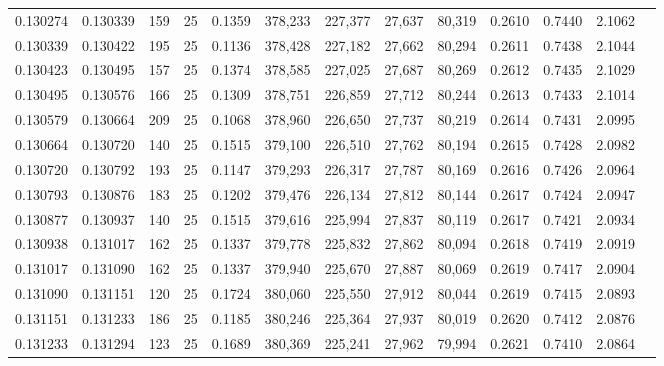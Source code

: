 \begin{tabular}{rrrrrrrrrrrrr}
0.130274 & 0.130339 &   159 &  25 &                                     0.1359 & 378,233 & 227,377 &  27,637 &  80,319 & 0.2610 & 0.7440 & 2.1062 \\
0.130339 & 0.130422 &   195 &  25 &                                     0.1136 & 378,428 & 227,182 &  27,662 &  80,294 & 0.2611 & 0.7438 & 2.1044 \\
0.130423 & 0.130495 &   157 &  25 &                                     0.1374 & 378,585 & 227,025 &  27,687 &  80,269 & 0.2612 & 0.7435 & 2.1029 \\
0.130495 & 0.130576 &   166 &  25 &                                     0.1309 & 378,751 & 226,859 &  27,712 &  80,244 & 0.2613 & 0.7433 & 2.1014 \\
0.130579 & 0.130664 &   209 &  25 &                                     0.1068 & 378,960 & 226,650 &  27,737 &  80,219 & 0.2614 & 0.7431 & 2.0995 \\
0.130664 & 0.130720 &   140 &  25 &                                     0.1515 & 379,100 & 226,510 &  27,762 &  80,194 & 0.2615 & 0.7428 & 2.0982 \\
0.130720 & 0.130792 &   193 &  25 &                                     0.1147 & 379,293 & 226,317 &  27,787 &  80,169 & 0.2616 & 0.7426 & 2.0964 \\
0.130793 & 0.130876 &   183 &  25 &                                     0.1202 & 379,476 & 226,134 &  27,812 &  80,144 & 0.2617 & 0.7424 & 2.0947 \\
0.130877 & 0.130937 &   140 &  25 &                                     0.1515 & 379,616 & 225,994 &  27,837 &  80,119 & 0.2617 & 0.7421 & 2.0934 \\
0.130938 & 0.131017 &   162 &  25 &                                     0.1337 & 379,778 & 225,832 &  27,862 &  80,094 & 0.2618 & 0.7419 & 2.0919 \\
0.131017 & 0.131090 &   162 &  25 &                                     0.1337 & 379,940 & 225,670 &  27,887 &  80,069 & 0.2619 & 0.7417 & 2.0904 \\
0.131090 & 0.131151 &   120 &  25 &                                     0.1724 & 380,060 & 225,550 &  27,912 &  80,044 & 0.2619 & 0.7415 & 2.0893 \\
0.131151 & 0.131233 &   186 &  25 &                                     0.1185 & 380,246 & 225,364 &  27,937 &  80,019 & 0.2620 & 0.7412 & 2.0876 \\
0.131233 & 0.131294 &   123 &  25 &                                     0.1689 & 380,369 & 225,241 &  27,962 &  79,994 & 0.2621 & 0.7410 & 2.0864 \\

\end{tabular}
